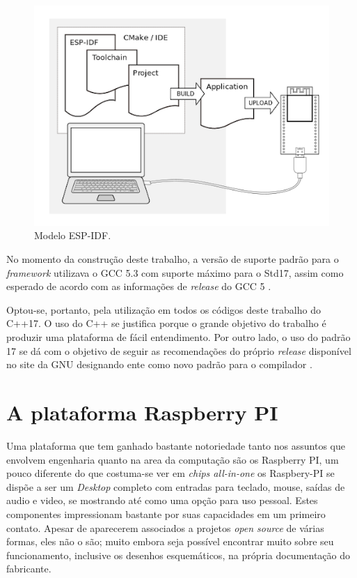 \begin{figure}[htb]
    \begin{center}
	    \includegraphics[scale=0.5]{figs/comp-flow.png}
	\end{center}
	\caption{Modelo \ac{ESP-IDF}.} 
\end{figure}

No momento da construção deste trabalho, a versão de suporte padrão para o \textit{framework} utilizava o GCC 5.3  com 
suporte máximo para o Std17\cite{suported-c}, assim como esperado de acordo com as informações de \textit{release} do GCC
5 \cite{gcc-5}. 

Optou-se, portanto, pela utilização em todos os códigos deste trabalho do C++17. O uso do C++ se justifica
porque o grande objetivo do trabalho é produzir uma plataforma de fácil entendimento. Por outro lado, o uso do padrão 17
se dá com o objetivo de seguir as recomendações do próprio \textit{release} disponível no site da GNU designando ente como
novo padrão para o compilador \cite{gcc-5}.


\section{A plataforma Raspberry PI\textregistered}

Uma plataforma que tem ganhado bastante notoriedade tanto nos assuntos que envolvem engenharia quanto na area da computação
são os Raspberry PI, um pouco diferente do que costuma-se ver em \textit{chips all-in-one} os Raspbery-PI se dispõe a 
ser um \textit{Desktop} completo com entradas para teclado, mouse, saídas de audio e video, se mostrando até como uma 
opção para uso pessoal. Estes componentes impressionam bastante por suas capacidades em um primeiro contato. Apesar 
de aparecerem associados a projetos \textit{open source} de várias formas, eles não o são; muito embora seja possível
encontrar muito sobre seu funcionamento, inclusive os desenhos esquemáticos, na própria documentação do fabricante. \cite{raspberry-pi}

